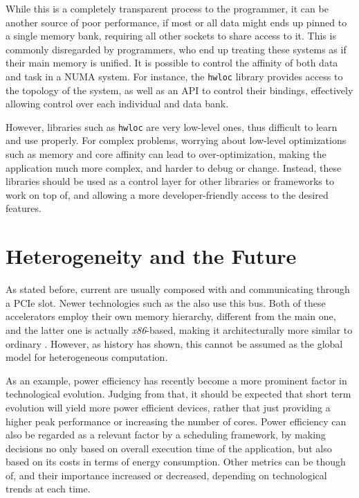 \documentclass[main.tex]{subfiles}
\begin{document}
While this is a completely transparent process to the programmer, it can be another source of poor performance, if most or all data might ends up pinned to a single memory bank, requiring all other sockets to share access to it. This is commonly disregarded by programmers, who end up treating these systems as if their main memory is unified. It is possible to control the affinity of both data and task in a \acs{NUMA} system. For instance, the \texttt{hwloc}\cite{broquedis2010hwloc} library provides access to the topology of the system, as well as an API to control their bindings, effectively allowing control over each individual \cpu and data bank.

However, libraries such as \texttt{hwloc} are very low-level ones, thus difficult to learn and use properly. For complex problems, worrying about low-level optimizations such as memory and core affinity can lead to over-optimization, making the application much more complex, and harder to debug or change.
Instead, these libraries should be used as a control layer for other libraries or frameworks to work on top of, and allowing a more developer-friendly access to the desired features.

\section{Heterogeneity and the Future}

As stated before, current \hetplats are usually composed with \cpus and \gpus communicating through a \acs{PCIe} slot. Newer technologies such as the \intel \mic also use this bus. Both of these accelerators employ their own memory hierarchy, different from the main one, and the latter one is actually \textit{x86}-based, making it architecturally more similar to ordinary \cpus. However, as history has shown, this cannot be assumed as the global model for heterogeneous computation.

As an example, power efficiency has recently become a more prominent factor in technological evolution. Judging from that, it should be expected that short term evolution will yield more power efficient devices, rather that just providing a higher peak performance or increasing the number of cores. Power efficiency can also be regarded as a relevant factor by a scheduling framework, by making decisions no only based on overall execution time of the application, but also based on its costs in terms of energy consumption.
Other metrics can be though of, and their importance increased or decreased, depending on technological trends at each time.
\end{document}
